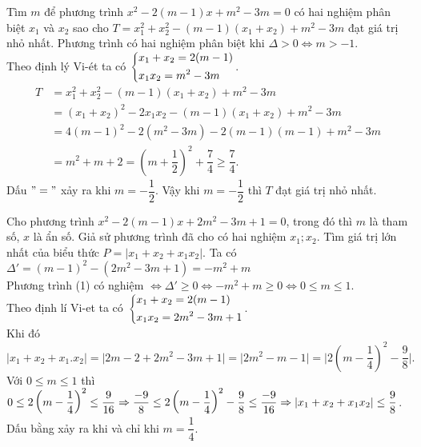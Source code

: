 \begin{ex}%
	Tìm $m$ để phương trình $x^2-2(m-1)x+m^2-3m=0 $ có hai nghiệm	 phân biệt $x_1$ và $x_2$ sao cho $T=x_1^2+x_2^2 -(m-1)(x_1+x_2)+m^2-3m$ đạt giá trị nhỏ nhất.
	\loigiai
	{Phương trình có hai nghiệm phân biệt khi $\Delta > 0 \Leftrightarrow m>-1$.\\
		Theo định lý Vi-ét  ta có $\left\{\begin{aligned}&x_1+x_2=2(m-1)\\&x_1x_2=m^2-3m\end{aligned}\right.$.
		\begin{align*}
		T&=x_1^2+x_2^2 -(m-1)(x_1+x_2)+m^2-3m\\
		&=(x_1+x_2)^2 -2x_1x_2 -(m-1)(x_1+x_2)+m^2-3m\\
		&=4(m-1)^2-2(m^2-3m)-2(m-1)(m-1)+m^2-3m\\
		&=m^2+m+2=\left(m+\dfrac{1}{2}\right)^2+\dfrac{7}{4} \geq \dfrac{7}{4}.
		\end{align*}
		Dấu $"="$ xảy ra khi $m=-\dfrac{1}{2}$. Vậy khi $m=-\dfrac{1}{2}$ thì $T$ đạt giá trị nhỏ nhất.
	}
\end{ex}
\begin{ex}%
	Cho phương trình $x^2-2(m-1)x+2m^2-3m+1=0$, trong đó thì $m$ là tham số, $x$ là ẩn số. Giả sử phương trình đã cho có hai nghiệm $x_1;x_2$. Tìm giá trị lớn nhất của biểu thức $P=\vert x_1+x_2+x_1x_2\vert$.
	\loigiai
	{Ta có $\Delta'=(m-1)^2-(2m^2-3m+1)=-m^2+m$\\
		Phương trình (1) có nghiệm $\Leftrightarrow	\Delta'\geq 0\Leftrightarrow -m^2+m\geq 0\Leftrightarrow 0\leq m\leq 1$.\\
		Theo định lí Vi-et ta có $\left\{\begin{aligned}& x_1+x_2=2(m-1)\\&x_1x_2=2m^2-3m+1\end{aligned}\right.$.\\
		Khi đó $\vert x_1+x_2+x_1.x_2\vert=\vert 2m-2+2m^2-3m+1 \vert=\vert 2m^2-m-1\vert=\Big\vert 2\left(m-\dfrac{1}{4}\right)^2-\dfrac{9}{8}\Big\vert.$\\
		Với $0\leq m\leq 1$ thì $ 0\leq2\left(m-\dfrac{1}{4}\right)^2\leq \dfrac{9}{16}\\\Rightarrow \dfrac{-9}{8}\leq 2\left(m-\dfrac{1}{4}\right)^2-\dfrac{9}{8}\leq \dfrac{-9}{16}\Rightarrow \vert x_1+x_2+x_1x_2\vert \leq \dfrac{9}{8}$. Dấu bằng xảy ra khi và chỉ khi $m=\dfrac{1}{4}$.
	}
\end{ex}
